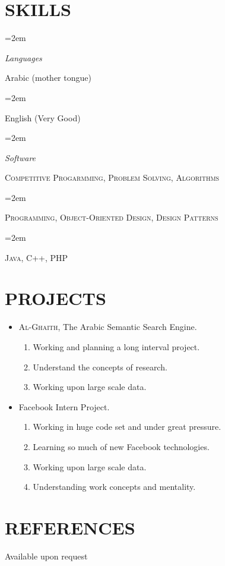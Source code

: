 \documentclass[paper=a4,fontsize=11pt]{scrartcl} %
\newlength{\spacebox}
\newcommand{\sepspace}{\vspace*{1em}}		%
\newcommand{\NewPart}[1]{\section*{\uppercase{#1}}}
\newcommand{\PersonalEntry}[2]{
		\noindent\hangindent=2em\hangafter=0 %
		\parbox{\spacebox}{        %
		\textit{#1}}		       %
		\hspace{1.5em} #2 \par}    %
\newcommand{\SkillsEntry}[2]{      %
		\noindent\hangindent=2em\hangafter=0 %
		\parbox{\spacebox}{        %
		\textit{#1}}			   %
		\hspace{1.5em} #2 \par}    %
\begin{document}
\NewPart{Skills}{}

	\SkillsEntry{Languages}{Arabic (mother tongue)}
	\SkillsEntry{}{English (Very Good)}
\sepspace

	\SkillsEntry{Software}{\textsc{Competitive Progarmming}, \textsc{Problem Solving}, \textsc{Algorithms}}
	\SkillsEntry{}{\textsc{Programming}, \textsc{Object-Oriented Design}, \textsc{Design Patterns}}
	\SkillsEntry{}{\textsc{Java}, \textsc{C++}, \textsc{PHP}}

\newpage
\NewPart{Projects}{}

\begin{itemize}
	\item \textsc{Al-Ghaith}, The Arabic Semantic Search Engine.
    \begin{enumerate}
    	\item Working and planning a long interval project.
        \item Understand the concepts of research.
        \item Working upon large scale data.
    \end{enumerate}
	\item Facebook Intern Project.
	\begin{enumerate}
		\item Working in huge code set and under great pressure.
		\item Learning so much of new Facebook technologies.
		\item Working upon large scale data.
		\item Understanding work concepts and mentality.
	\end{enumerate}

	\end{itemize}

\NewPart{References}{}
Available upon request
\end{document}
